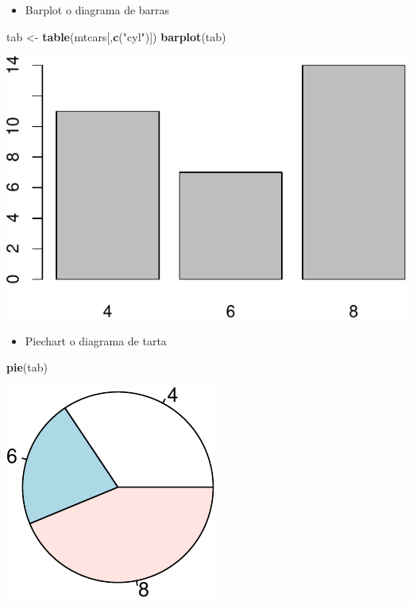 \documentclass[]{article}
\def\tightlist{}
\newenvironment{Shaded}{\begin{snugshade}}{\end{snugshade}}
\newcommand{\KeywordTok}[1]{\textcolor[rgb]{0.13,0.29,0.53}{\textbf{{#1}}}}
\newcommand{\StringTok}[1]{\textcolor[rgb]{0.31,0.60,0.02}{{#1}}}
\newcommand{\NormalTok}[1]{{#1}}
\numberwithin{equation}{section}
\begin{document}
\begin{itemize}
\tightlist
\item
  Barplot o diagrama de barras
\end{itemize}

\begin{Shaded}
\begin{Highlighting}[]
\NormalTok{tab <-}\StringTok{ }\KeywordTok{table}\NormalTok{(mtcars[,}\KeywordTok{c}\NormalTok{(}\StringTok{"cyl"}\NormalTok{)])}
\KeywordTok{barplot}\NormalTok{(tab)}
\end{Highlighting}
\end{Shaded}

\includegraphics{tema1_files/figure-latex/unnamed-chunk-65-1.pdf}

\begin{itemize}
\tightlist
\item
  Piechart o diagrama de tarta
\end{itemize}

\begin{Shaded}
\begin{Highlighting}[]
\KeywordTok{pie}\NormalTok{(tab)}
\end{Highlighting}
\end{Shaded}

\begin{center}\includegraphics{tema1_files/figure-latex/unnamed-chunk-66-1} \end{center}
\end{document}
